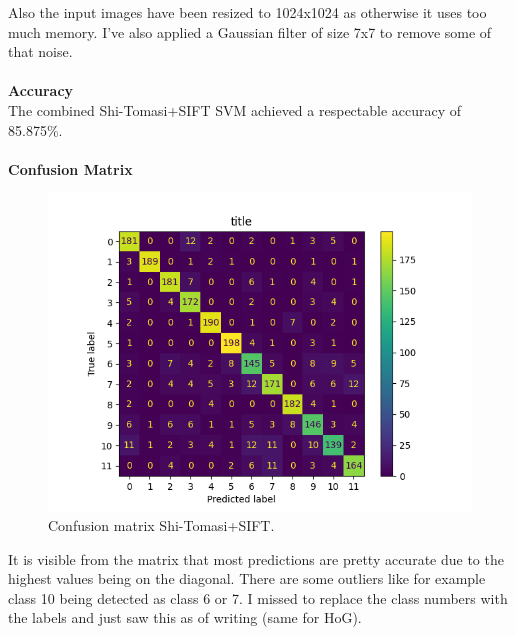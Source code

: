 \documentclass[UTF-8]{article}
\begin{document}
Also the input images have been resized to 1024x1024 as otherwise it uses too much memory. I've also applied a Gaussian filter of size 7x7 to remove some of that noise.
\\\\
\textbf{Accuracy}\\
The combined Shi-Tomasi+SIFT SVM achieved a respectable accuracy of 85.875\%.\\\\
\textbf{Confusion Matrix}\\
\begin{figure}[H]
	\centering
	\includegraphics[width=0.7\linewidth]{_images/ShiTomasiConfusionMat}
	\caption{Confusion matrix Shi-Tomasi+SIFT.}
	\label{fig:shitomasiconfusionmat}
\end{figure}
It is visible from the matrix that most predictions are pretty accurate due to the highest values being on the diagonal. There are some outliers like for example class 10 being detected as class 6 or 7. I missed to replace the class numbers with the labels and just saw this as of writing (same for HoG).
\end{document}
